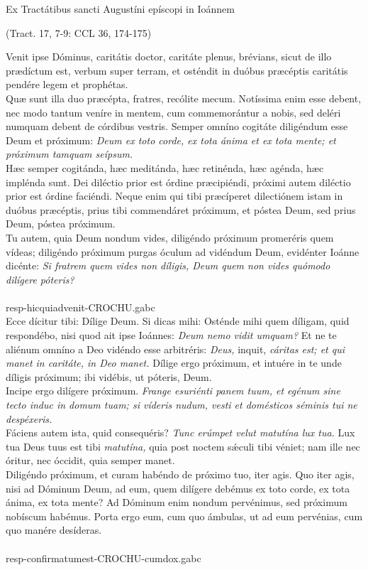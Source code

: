 \documentclass[options]{article}
\begin{document}
	Ex Tractátibus sancti Augustíni epíscopi in Ioánnem 
	\begin{flushright}
			(Tract. 17, 7-9: CCL 36, 174-175)
	\end{flushright}	
	Venit ipse Dóminus, caritátis doctor, caritáte plenus, brévians, sicut de illo prædíctum est, verbum super terram, et osténdit in duóbus præcéptis caritátis pendére legem et prophétas.\\

	Quæ sunt illa duo præcépta, fratres, recólite mecum. Notíssima enim esse debent, nec modo tantum veníre in mentem, cum commemorántur a nobis, sed deléri numquam debent de córdibus vestris. Semper omníno cogitáte diligéndum esse Deum et próximum: \emph{Deum ex toto corde, ex tota ánima et ex tota mente; et próximum tamquam seípsum.}\\
	Hæc semper cogitánda, hæc meditánda, hæc retinénda, hæc agénda, hæc implénda sunt. Dei diléctio prior est órdine præcipiéndi, próximi autem diléctio prior est órdine faciéndi. Neque enim qui tibi præcíperet dilectiónem istam in duóbus præcéptis, prius tibi commendáret próximum, et póstea Deum, sed prius Deum, póstea próximum.\\
	Tu autem, quia Deum nondum vides, diligéndo próximum promeréris quem vídeas; diligéndo próximum purgas óculum ad vidéndum Deum, evidénter Ioánne dicénte: \emph{Si fratrem quem vides non díligis, Deum quem non vides quómodo dilígere póteris?}\\
	\\
	resp-hicquiadvenit-CROCHU.gabc
	\\
	Ecce dícitur tibi: Dílige Deum. Si dicas mihi: Osténde mihi quem díligam, quid respondébo, nisi quod ait ipse Ioánnes: \emph{Deum nemo vidit umquam?} Et ne te aliénum omníno a Deo vidéndo esse arbitréris: \emph{Deus,} inquit, \emph{cáritas est; et qui manet in caritáte, in Deo manet.} Dílige ergo próximum, et intuére in te unde díligis próximum; ibi vidébis, ut póteris, Deum.\\
	Incipe ergo dilígere próximum. \emph{Frange esuriénti panem tuum, et egénum sine tecto induc in domum tuam; si víderis nudum, vesti et domésticos séminis tui ne despéxeris.}\\
	Fáciens autem ista, quid consequéris? \emph{Tunc erúmpet velut matutína lux tua.} Lux tua Deus tuus est tibi \emph{matutína,} quia post noctem s\'{æ}culi tibi véniet; nam ille nec óritur, nec óccidit, quia semper manet.\\
	Diligéndo próximum, et curam habéndo de próximo tuo, iter agis. Quo iter agis, nisi ad Dóminum Deum, ad eum, quem dilígere debémus ex toto corde, ex tota ánima, ex tota mente? Ad Dóminum enim nondum pervénimus, sed próximum nobíscum habémus. Porta ergo eum, cum quo ámbulas, ut ad eum pervénias, cum quo manére desíderas.\\
	\\
resp-confirmatumest-CROCHU-cumdox.gabc
\end{document}
